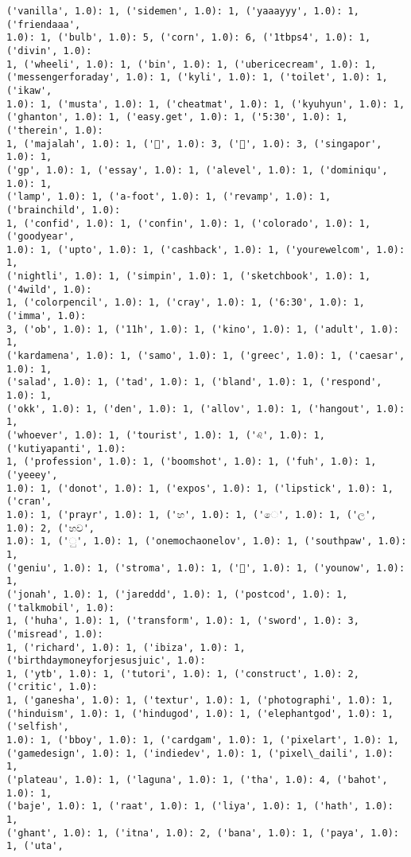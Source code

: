 \documentclass[11pt]{article}
\begin{document}
\begin{Verbatim}[commandchars=\\\{\}]
('vanilla', 1.0): 1, ('sidemen', 1.0): 1, ('yaaayyy', 1.0): 1, ('friendaaa',
1.0): 1, ('bulb', 1.0): 5, ('corn', 1.0): 6, ('1tbps4', 1.0): 1, ('divin', 1.0):
1, ('wheeli', 1.0): 1, ('bin', 1.0): 1, ('ubericecream', 1.0): 1,
('messengerforaday', 1.0): 1, ('kyli', 1.0): 1, ('toilet', 1.0): 1, ('ikaw',
1.0): 1, ('musta', 1.0): 1, ('cheatmat', 1.0): 1, ('kyuhyun', 1.0): 1,
('ghanton', 1.0): 1, ('easy.get', 1.0): 1, ('5:30', 1.0): 1, ('therein', 1.0):
1, ('majalah', 1.0): 1, ('🏼', 1.0): 3, ('🌸', 1.0): 3, ('singapor', 1.0): 1,
('gp', 1.0): 1, ('essay', 1.0): 1, ('alevel', 1.0): 1, ('dominiqu', 1.0): 1,
('lamp', 1.0): 1, ('a-foot', 1.0): 1, ('revamp', 1.0): 1, ('brainchild', 1.0):
1, ('confid', 1.0): 1, ('confin', 1.0): 1, ('colorado', 1.0): 1, ('goodyear',
1.0): 1, ('upto', 1.0): 1, ('cashback', 1.0): 1, ('yourewelcom', 1.0): 1,
('nightli', 1.0): 1, ('simpin', 1.0): 1, ('sketchbook', 1.0): 1, ('4wild', 1.0):
1, ('colorpencil', 1.0): 1, ('cray', 1.0): 1, ('6:30', 1.0): 1, ('imma', 1.0):
3, ('ob', 1.0): 1, ('11h', 1.0): 1, ('kino', 1.0): 1, ('adult', 1.0): 1,
('kardamena', 1.0): 1, ('samo', 1.0): 1, ('greec', 1.0): 1, ('caesar', 1.0): 1,
('salad', 1.0): 1, ('tad', 1.0): 1, ('bland', 1.0): 1, ('respond', 1.0): 1,
('okk', 1.0): 1, ('den', 1.0): 1, ('allov', 1.0): 1, ('hangout', 1.0): 1,
('whoever', 1.0): 1, ('tourist', 1.0): 1, ('♌', 1.0): 1, ('kutiyapanti', 1.0):
1, ('profession', 1.0): 1, ('boomshot', 1.0): 1, ('fuh', 1.0): 1, ('yeeey',
1.0): 1, ('donot', 1.0): 1, ('expos', 1.0): 1, ('lipstick', 1.0): 1, ('cran',
1.0): 1, ('prayr', 1.0): 1, ('හ', 1.0): 1, ('ෙ', 1.0): 1, ('ල', 1.0): 2, ('හව',
1.0): 1, ('ු', 1.0): 1, ('onemochaonelov', 1.0): 1, ('southpaw', 1.0): 1,
('geniu', 1.0): 1, ('stroma', 1.0): 1, ('🔴', 1.0): 1, ('younow', 1.0): 1,
('jonah', 1.0): 1, ('jareddd', 1.0): 1, ('postcod', 1.0): 1, ('talkmobil', 1.0):
1, ('huha', 1.0): 1, ('transform', 1.0): 1, ('sword', 1.0): 3, ('misread', 1.0):
1, ('richard', 1.0): 1, ('ibiza', 1.0): 1, ('birthdaymoneyforjesusjuic', 1.0):
1, ('ytb', 1.0): 1, ('tutori', 1.0): 1, ('construct', 1.0): 2, ('critic', 1.0):
1, ('ganesha', 1.0): 1, ('textur', 1.0): 1, ('photographi', 1.0): 1,
('hinduism', 1.0): 1, ('hindugod', 1.0): 1, ('elephantgod', 1.0): 1, ('selfish',
1.0): 1, ('bboy', 1.0): 1, ('cardgam', 1.0): 1, ('pixelart', 1.0): 1,
('gamedesign', 1.0): 1, ('indiedev', 1.0): 1, ('pixel\_daili', 1.0): 1,
('plateau', 1.0): 1, ('laguna', 1.0): 1, ('tha', 1.0): 4, ('bahot', 1.0): 1,
('baje', 1.0): 1, ('raat', 1.0): 1, ('liya', 1.0): 1, ('hath', 1.0): 1,
('ghant', 1.0): 1, ('itna', 1.0): 2, ('bana', 1.0): 1, ('paya', 1.0): 1, ('uta',

\end{Verbatim}
\end{document}
